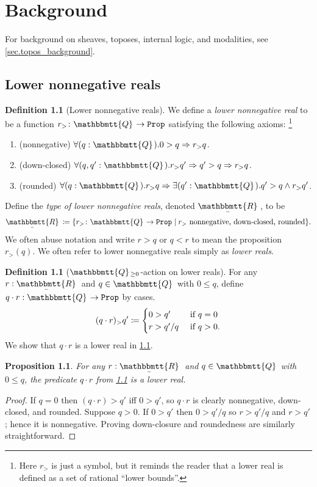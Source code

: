 \documentclass[11pt, oneside, article]{memoir}
\theoremstyle{plain}
\newtheorem{proposition}[theorem]{Proposition}
\theoremstyle{definition}
\newtheorem{definition}[theorem]{Definition}
\theoremstyle{remark}
\newcommand{\const}[1]{\mathtt{#1}}
\newcommand{\tn}[1]{\textnormal{#1}}
\newcommand{\ubar}[1]{\underaccent{\bar}{#1}}
\newcommand{\internal}[1]{\raisebox{-.03ex}{$\mathbbmtt{#1}$}}
\newcommand{\hs}{\hspace{1.1pt}}
\newcommand{\tqq}{\internal{Q}\hs}
\newcommand{\trr}{\internal{R}\hs}
\newcommand{\tlrr}{\ubar{\trr}\hs}
\newcommand{\prop}{\const{Prop}}
\newcommand{\imp}{\Rightarrow}
\begin{document}
\chapter{Background}\label{chap.background}

For background on sheaves, toposes, internal logic, and modalities, see \cref{sec.topos_background}.

\section{Lower nonnegative reals}

\begin{definition}[Lower nonnegative reals]\label{def.lower_nn_reals}
We define a \emph{lower nonnegative real} to be a function $r_>\colon\tqq\to\prop$ satisfying the following axioms:%
\footnote{Here $r_>$ is just a symbol, but it reminds the reader that a lower real is defined as a set of rational ``lower bounds''.}
\begin{enumerate}
	\item (nonnegative) $\forall(q:\tqq).0>q\imp r_>q$.
	\item (down-closed) $\forall(q,q':\tqq). r_>q'\imp q'>q\imp r_>q$.
	\item (rounded) $\forall (q:\tqq).r_>q\imp\exists (q':\tqq).q'>q\wedge r_>q'$.
\end{enumerate}
Define the \emph{type of lower nonnegative reals}, denoted $\tlrr$, to be
\[\tlrr\coloneqq\{r_>\colon\tqq\to\prop\mid r_>\tn{ nonnegative, down-closed, rounded}\}.
\]
We often abuse notation and write $r>q$ or $q<r$ to mean the proposition $r_>(q)$. We often refer to lower nonnegative reals simply as \emph{lower reals}.
\end{definition}

\begin{definition}[$\tqq_{\geq0}$-action on lower reals]\label{def.Q_action}
For any $r:\tlrr$ and $q\in\tqq$ with $0\leq q$, define $q\cdot r:\tqq\to\prop$ by cases.
\[
(q\cdot r)_>q'\coloneqq
\begin{cases}
	0>q'&\tn{ if }q=0\\
	r>q'/q&\tn{ if }q>0.
\end{cases}
\]
We show that $q\cdot r$ is a lower real in \cref{prop.Q_action_lower_real}.
\end{definition}

\begin{proposition}\label{prop.Q_action_lower_real}
For any $r:\tlrr$ and $q\in\tqq$ with $0\leq q$, the predicate $q\cdot r$ from \cref{def.Q_action} is a lower real.
\end{proposition}
\begin{proof}
If $q=0$ then $(q\cdot r)>q'$ iff $0>q'$, so $q\cdot r$ is clearly nonnegative, down-closed, and rounded. Suppose $q>0$. If $0>q'$ then $0>q'/q$ so $r>q'/q$ and $r>q'$; hence it is nonnegative. Proving down-closure and roundedness are similarly straightforward.
\end{proof}
\end{document}
